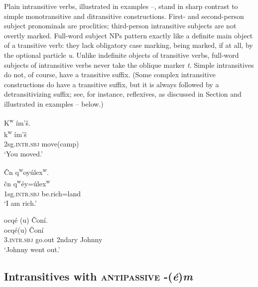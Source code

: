 \documentclass[output=paper,colorlinks,citecolor=brown]{langscibook}
\begin{document}
Plain intransitive verbs, illustrated in examples --, stand in sharp
contrast to simple monotransitive and ditransitive constructions.
First- and second-person subject pronominals are proclitics;
third-person intransitive subjects are not overtly marked.  Full-word
subject NPs pattern exactly like a definite main object of a
transitive verb: they lack obligatory case marking, being marked, if at
all, by the optional particle \emph{{\textltilde}u}.  Unlike indefinite
objects of transitive verbs, full-word subjects of intransitive verbs
never take the oblique marker \emph{t}.  Simple intransitives do not,
of course, have a transitive suffix.  (Some complex intransitive
constructions do have a transitive suffix, but it is always followed
by a detransitivizing suffix; see, for instance, reflexives, as
discussed in Section  and illustrated in examples -- below.)

\ea
\label{ex-thomason-11}
K\textsuperscript w \textglotstop\'im'\v{s}.  \\
\gll k\textsuperscript w \textglotstop\'im'\v{s}\\
2sg.\textsc{intr.sbj} move(camp)\\  
\glt `You moved.'
\z

\ea 
\label{ex-thomason-12}
\v{C}n {q\textsuperscript w}oy\'ulex\textsuperscript w.  \\
\gll \v{c}n q\textsuperscript w\'ey=\'ulex\textsuperscript w\\
1sg.\textsc{intr.sbj} be.rich=land\\  

\glt `I am rich.'
\z

\ea 
\label{ex-thomason-13}
{\textglotstop}ocq\'e{\textglotstop} ({\textltilde}u)  \v{C}on\'i. \\
  {\textglotstop}ocq\'e\textglotstop ({\textltilde}u) \v{C}on\'i\\
3.\textsc{intr.sbj}  go.out 2ndary Johnny\\
 \glt `Johnny went out.'
 \z


\subsection{Intransitives with \textsc{antipassive} -(\emph{\'e})\emph{m}}  %
\label{thomason_section_2.4}
\end{document}
